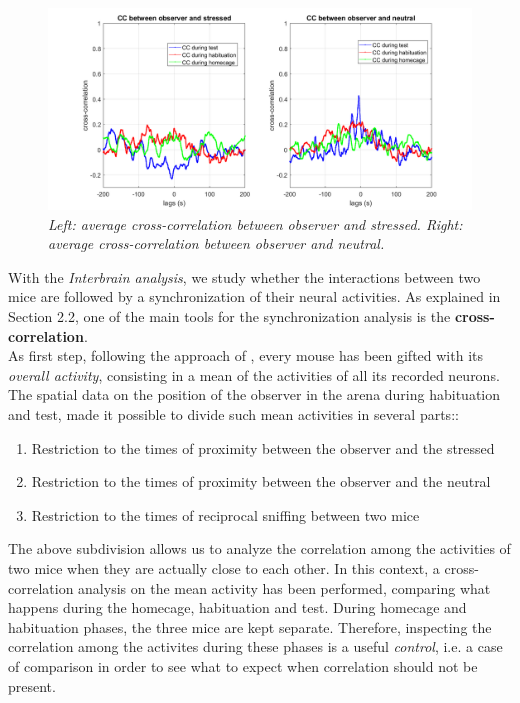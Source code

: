 \documentclass[12pt, a4paper]{report}
\begin{document}
\begin{figure}[H]
	
	\begin{center}
		\hspace*{-1.4cm}
		\includegraphics[scale=.5]{average_cc.png} 
	\end{center} 
	\caption{\textit{Left: average cross-correlation between observer and stressed. Right: average cross-correlation between observer and neutral.}} \label{cc}
	
\end{figure}

With the \textit{Interbrain analysis}, we study whether the interactions between two mice are followed by a synchronization of their neural activities. As explained in Section 2.2, one of the main tools for the synchronization analysis is the \textbf{cross-correlation}.\\
As first step, following the approach of \cite{16}, every mouse has been gifted with its \textit{overall activity}, consisting in a mean of the activities of all its recorded neurons. The spatial data on the position of the observer in the arena during habituation and test, made it possible to divide such mean activities in several parts::

\begin{enumerate}
	\item Restriction to the times of proximity between the observer and the stressed
	\item Restriction to the times of proximity between the observer and the neutral
	\item Restriction to the times of reciprocal sniffing between two mice
\end{enumerate}

The above subdivision allows us to analyze the correlation among the activities of two mice when they are actually close to each other. In this context, a cross-correlation analysis on the mean activity has been performed, comparing what happens during the homecage, habituation and test. During homecage and habituation phases, the three mice are kept separate. Therefore, inspecting the correlation among the activites during these phases is a useful \textit{control}, i.e. a case of comparison in order to see what to expect when correlation should not be present.
\\
\end{document}
